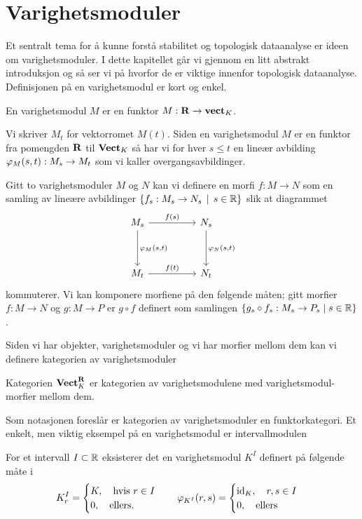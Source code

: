\section{Varighetsmoduler}\label{sek:VarMod}
Et sentralt tema for å kunne forstå stabilitet og topologisk dataanalyse er ideen om varighetsmoduler. I dette kapitellet går vi gjennom en litt abstrakt introduksjon og så ser vi på hvorfor de er viktige innenfor topologisk dataanalyse. Definisjonen på en varighetsmodul er kort og enkel.

\begin{definisjon}\label{Def:PersMod}
    En varighetsmodul $M$ er en funktor $M:\textnormal{\textbf{{R}}}\to\textnormal{\textbf{vect}}_K$.
\end{definisjon}

Vi skriver $M_t$ for vektorromet $M(t)$. Siden en varighetsmodul $M$ er en funktor fra pomengden $\textnormal{\textbf{{R}}}$ til $\textnormal{\textbf{Vect}}_K$ så har vi for hver $s\leq t$ en lineær avbilding $\varphi_M(s,t): M_s\to M_t$ som vi kaller overgangsavbildinger.

Gitt to varighetsmoduler $M$ og $N$ kan vi definere en morfi $f: M\to N$ som en samling av lineære avbildinger
$\left\{f_s: M_s\to N_s\,\mid\,s\in\mathbb{R}\right\}$ slik at diagrammet
\[
\begin{tikzcd}
	{M_s} && {N_s} \\
	\\
	{M_t} && {N_t}
	\arrow["{f(s)}", from=1-1, to=1-3]
	\arrow["{\p_M(s,t)}", from=1-1, to=3-1]
	\arrow["{\p_N(s,t)}", from=1-3, to=3-3]
	\arrow["{f(t)}", from=3-1, to=3-3]
\end{tikzcd}
\]
kommuterer. Vi kan komponere morfiene på den følgende måten; gitt morfier $f:M\to N$ og $g:M\to P$ er $g\circ f$ definert som samlingen $\{g_s\circ f_s: M_s\to P_s\;|\;s\in\mathbb{R}\}$.

Siden vi har objekter, varighetsmoduler og vi har morfier mellom dem kan vi definere kategorien av varighetsmoduler

\begin{definisjon}\label{Def:KatPMod}
    Kategorien $\textnormal{\textbf{Vect}}_K^{\textnormal{\textbf{{R}}}}$ er kategorien av varighetsmodulene med varighetsmodul-morfier mellom dem.
\end{definisjon}

Som notasjonen foreslår er kategorien av varighetsmoduler en funktorkategori.
Et enkelt, men viktig eksempel på en varighetsmodul er intervallmodulen

\begin{eksempel}\label{eks:IntMod}
For et intervall $I\subset\mathbb{R}$ eksisterer det en varighetsmodul $K^I$ definert på følgende måte i \cite{Bauer2018}
\[
K^I_r =
\begin{cases}
K, \quad\text{hvis } r\in I\\
0, \quad\text{ellers.}
\end{cases}\quad 
\varphi_{K^I}(r,s) = 
\begin{cases}
\textnormal{id}_K,\quad r,s\in I\\
0,\quad \text{ellers}
\end{cases}
\]
\end{eksempel}

